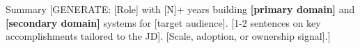 \documentclass{resume}
\begin{document}
%
%
%
%

\vspace{-0.15cm}

\begin{rSection}{Summary}
[GENERATE: [Role] with [N]+ years building \textbf{[primary domain]} and \textbf{[secondary domain]} systems for [target audience]. [1-2 sentences on key accomplishments tailored to the JD]. [Scale, adoption, or ownership signal].]
\end{rSection}
\vspace{-0.15cm}
\end{document}
